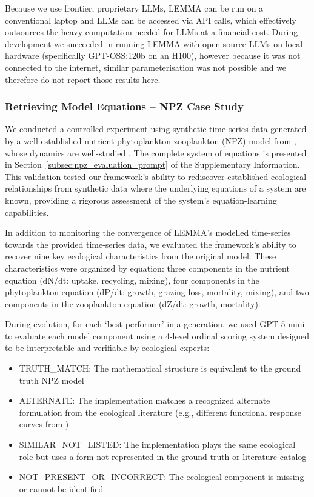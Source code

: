 Because we use frontier, proprietary LLMs, LEMMA can be run on a conventional laptop and LLMs can be accessed via API calls, which effectively outsources the heavy computation needed for LLMs at a financial cost. During development we succeeded in running LEMMA with open-source LLMs on local hardware (specifically GPT-OSS:120b on an H100), however because it was not connected to the internet, similar parameterisation was not possible and we therefore do not report those results here. 

\subsubsection{Retrieving Model Equations -- NPZ Case Study}

We conducted a controlled experiment using synthetic time-series data generated by a well-established nutrient-phytoplankton-zooplankton (NPZ) model from \cite{edwards1999zooplankton}, whose dynamics are well-studied \citep{boschetti2008mapping,boschetti2010detecting}. The complete system of equations is presented in Section~\ref{subsec:npz_evaluation_prompt} of the Supplementary Information. This validation tested our framework's ability to rediscover established ecological relationships from synthetic data where the underlying equations of a system are known, providing a rigorous assessment of the system's equation-learning capabilities.

In addition to monitoring the convergence of LEMMA's modelled time-series towards the provided time-series data, we evaluated the framework's ability to recover nine key ecological characteristics from the original model. These characteristics were organized by equation: three components in the nutrient equation (dN/dt: uptake, recycling, mixing), four components in the phytoplankton equation (dP/dt: growth, grazing loss, mortality, mixing), and two components in the zooplankton equation (dZ/dt: growth, mortality).

During evolution, for each `best performer' in a generation, we used GPT-5-mini to evaluate each model component using a 4-level ordinal scoring system designed to be interpretable and verifiable by ecological experts:

\begin{itemize}
    \item TRUTH\_MATCH: The mathematical structure is equivalent to the ground truth NPZ model
    \item ALTERNATE: The implementation matches a recognized alternate formulation from the ecological literature (e.g., different functional response curves from \citep{franks2002npz})
    \item SIMILAR\_NOT\_LISTED: The implementation plays the same ecological role but uses a form not represented in the ground truth or literature catalog
    \item NOT\_PRESENT\_OR\_INCORRECT: The ecological component is missing or cannot be identified
\end{itemize}

